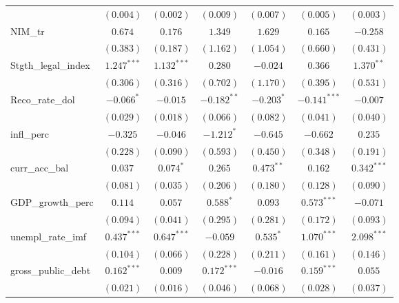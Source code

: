 \begin{table}
\begin{center}
\begin{tabular}{l c c c c c c}
                    & $(0.004)$      & $(0.002)$      & $(0.009)$      & $(0.007)$    & $(0.005)$      & $(0.003)$     \\
NIM\_tr             & $0.674$        & $0.176$        & $1.349$        & $1.629$      & $0.165$        & $-0.258$      \\
                    & $(0.383)$      & $(0.187)$      & $(1.162)$      & $(1.054)$    & $(0.660)$      & $(0.431)$     \\
Stgth\_legal\_index & $1.247^{***}$  & $1.132^{***}$  & $0.280$        & $-0.024$     & $0.366$        & $1.370^{**}$  \\
                    & $(0.306)$      & $(0.316)$      & $(0.702)$      & $(1.170)$    & $(0.395)$      & $(0.531)$     \\
Reco\_rate\_dol     & $-0.066^{*}$   & $-0.015$       & $-0.182^{**}$  & $-0.203^{*}$ & $-0.141^{***}$ & $-0.007$      \\
                    & $(0.029)$      & $(0.018)$      & $(0.066)$      & $(0.082)$    & $(0.041)$      & $(0.040)$     \\
infl\_perc          & $-0.325$       & $-0.046$       & $-1.212^{*}$   & $-0.645$     & $-0.662$       & $0.235$       \\
                    & $(0.228)$      & $(0.090)$      & $(0.593)$      & $(0.450)$    & $(0.348)$      & $(0.191)$     \\
curr\_acc\_bal      & $0.037$        & $0.074^{*}$    & $0.265$        & $0.473^{**}$ & $0.162$        & $0.342^{***}$ \\
                    & $(0.081)$      & $(0.035)$      & $(0.206)$      & $(0.180)$    & $(0.128)$      & $(0.090)$     \\
GDP\_growth\_perc   & $0.114$        & $0.057$        & $0.588^{*}$    & $0.093$      & $0.573^{***}$  & $-0.071$      \\
                    & $(0.094)$      & $(0.041)$      & $(0.295)$      & $(0.281)$    & $(0.172)$      & $(0.093)$     \\
unempl\_rate\_imf   & $0.437^{***}$  & $0.647^{***}$  & $-0.059$       & $0.535^{*}$  & $1.070^{***}$  & $2.098^{***}$ \\
                    & $(0.104)$      & $(0.066)$      & $(0.228)$      & $(0.211)$    & $(0.161)$      & $(0.146)$     \\
gross\_public\_debt & $0.162^{***}$  & $0.009$        & $0.172^{***}$  & $-0.016$     & $0.159^{***}$  & $0.055$       \\
                    & $(0.021)$      & $(0.016)$      & $(0.046)$      & $(0.068)$    & $(0.028)$      & $(0.037)$     \\

\end{tabular}
\end{center}
\end{table}
